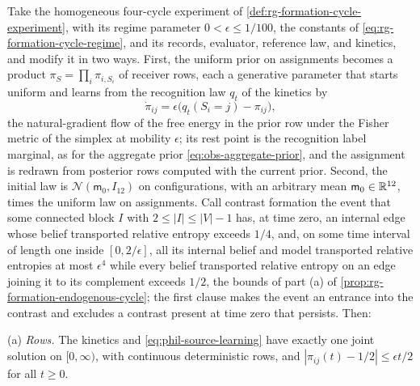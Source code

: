 Take the homogeneous four-cycle experiment of
\cref{def:rg-formation-cycle-experiment}, with its regime parameter
\(0<\epsilon\le1/100\), the constants of \cref{eq:rg-formation-cycle-regime},
and its records, evaluator, reference law, and kinetics, and modify it in two
ways. First, the uniform prior on assignments becomes a product
\(\pi_S=\prod_i\pi_{i,S_i}\) of receiver rows, each a generative parameter that
starts uniform and learns from the recognition law \(q_t\) of the kinetics by
\begin{equation}
\dot\pi_{ij}=\epsilon\bigl(q_t(S_i=j)-\pi_{ij}\bigr),
\label{eq:phil-source-learning}
\end{equation}
the natural-gradient flow of the free energy in the prior row under the Fisher
metric of the simplex at mobility \(\epsilon\); its rest point is the recognition
label marginal, as for the aggregate prior \eqref{eq:obs-aggregate-prior}, and the
assignment is redrawn from posterior rows computed with the current prior.
Second, the initial law is \(\mathcal N(\mathsf m_0,I_{12})\) on configurations,
with an arbitrary mean \(\mathsf m_0\in\mathbb R^{12}\), times the uniform law on
assignments. Call contrast formation the event that some connected block \(I\)
with \(2\le|I|\le|V|-1\) has, at time zero, an internal edge whose belief
transported relative entropy exceeds \(1/4\), and, on some time interval of
length one inside \([0,2/\epsilon]\), all its internal belief and model
transported relative entropies at most \(\epsilon^4\) while every belief
transported relative entropy on an edge joining it to its complement exceeds
\(1/2\), the bounds of part (a) of \cref{prop:rg-formation-endogenous-cycle};
the first clause makes the event an entrance into the contrast and excludes a
contrast present at time zero that persists. Then:

(a) \emph{Rows.} The kinetics and \cref{eq:phil-source-learning} have exactly
one joint solution on \([0,\infty)\), with continuous deterministic rows, and
\(|\pi_{ij}(t)-1/2|\le\epsilon t/2\) for all \(t\ge0\).

